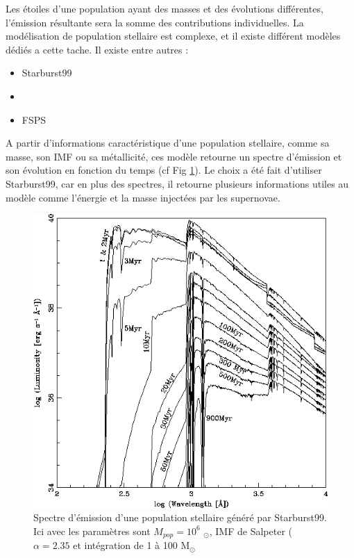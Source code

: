 Les étoiles d'une population ayant des masses et des évolutions différentes, l'émission résultante sera la somme des contributions individuelles.
La modélisation de population stellaire est complexe, et il existe différent modèles dédiés a cette tache.
Il existe entre autres :

\begin{itemize}
\item Starburst99 \citep{leitherer_starburst99:_1999} 
\item \cite{2003MNRAS.344.1000B}
\item FSPS \cite{2009ApJ...699..486C}
\end{itemize}

A partir d'informations caractéristique d'une population stellaire, comme sa masse, son \ac{IMF} ou sa métallicité, ces modèle retourne un spectre d'émission et son évolution en fonction du temps (cf Fig \ref{fig:spectre_starburst}).
Le choix a été fait d'utiliser Starburst99, car en plus des spectres, il retourne plusieurs informations utiles au modèle comme l'énergie et la masse injectées par les supernovae. %

\begin{figure}[htbp]
        \includegraphics[width=.95\linewidth]{img/03/spectre_starburst.jpg} 
        \caption{Spectre d'émission d'une population stellaire généré par Starburst99.
        Ici avec les paramètres sont $M_{pop}=10^6$ $_\odot$, \ac{IMF} de Salpeter ($\alpha=2.35$ et intégration de 1 à 100 M$_\odot$ 
 		\label{fig:spectre_starburst}}
\end{figure}

